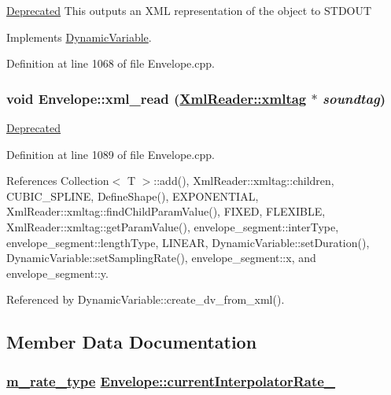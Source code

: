 \begin{Desc}
\item[\hyperlink{deprecated__deprecated000013}{Deprecated}]This outputs an XML representation of the object to STDOUT \end{Desc}


Implements \hyperlink{classDynamicVariable_a11}{Dynamic\-Variable}.

Definition at line 1068 of file Envelope.cpp.\hypertarget{classEnvelope_a31}{
\subsubsection[xml\_\-read]{\setlength{\rightskip}{0pt plus 5cm}void Envelope::xml\_\-read (\hyperlink{classXmlReader_1_1xmltag}{Xml\-Reader::xmltag} $\ast$ {\em soundtag})}}
\label{classEnvelope_a31}


\begin{Desc}
\item[\hyperlink{deprecated__deprecated000015}{Deprecated}]\end{Desc}


Definition at line 1089 of file Envelope.cpp.

References Collection$<$ T $>$::add(), Xml\-Reader::xmltag::children, CUBIC\_\-SPLINE, Define\-Shape(), EXPONENTIAL, Xml\-Reader::xmltag::find\-Child\-Param\-Value(), FIXED, FLEXIBLE, Xml\-Reader::xmltag::get\-Param\-Value(), envelope\_\-segment::inter\-Type, envelope\_\-segment::length\-Type, LINEAR, Dynamic\-Variable::set\-Duration(), Dynamic\-Variable::set\-Sampling\-Rate(), envelope\_\-segment::x, and envelope\_\-segment::y.

Referenced by Dynamic\-Variable::create\_\-dv\_\-from\_\-xml().

\subsection{Member Data Documentation}
\hypertarget{classEnvelope_r4}{
\subsubsection[currentInterpolatorRate\_\-]{\setlength{\rightskip}{0pt plus 5cm}\hyperlink{Types_8h_a4}{m\_\-rate\_\-type} \hyperlink{classEnvelope_r4}{Envelope::current\-Interpolator\-Rate\_\-}}}
\label{classEnvelope_r4}


